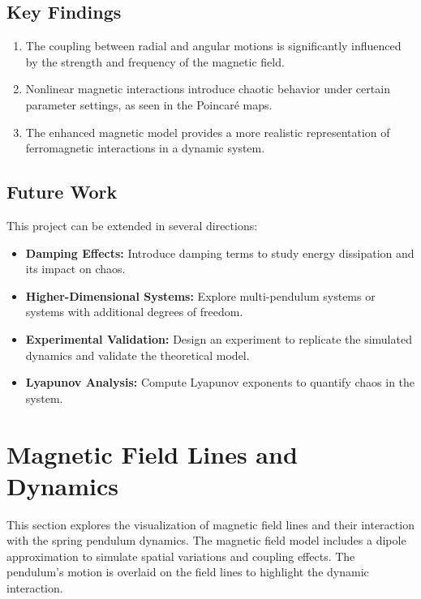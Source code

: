 \documentclass[12pt]{article}
\begin{document}
\subsection{Key Findings}
\begin{enumerate}
    \item The coupling between radial and angular motions is significantly influenced by the strength and frequency of the magnetic field.
    \item Nonlinear magnetic interactions introduce chaotic behavior under certain parameter settings, as seen in the Poincaré maps.
    \item The enhanced magnetic model provides a more realistic representation of ferromagnetic interactions in a dynamic system.
\end{enumerate}

\subsection{Future Work}
This project can be extended in several directions:
\begin{itemize}
    \item \textbf{Damping Effects:} Introduce damping terms to study energy dissipation and its impact on chaos.
    \item \textbf{Higher-Dimensional Systems:} Explore multi-pendulum systems or systems with additional degrees of freedom.
    \item \textbf{Experimental Validation:} Design an experiment to replicate the simulated dynamics and validate the theoretical model.
    \item \textbf{Lyapunov Analysis:} Compute Lyapunov exponents to quantify chaos in the system.
\end{itemize}

\section{Magnetic Field Lines and Dynamics}

This section explores the visualization of magnetic field lines and their interaction with the spring pendulum dynamics. The magnetic field model includes a dipole approximation to simulate spatial variations and coupling effects. The pendulum's motion is overlaid on the field lines to highlight the dynamic interaction.
\end{document}
